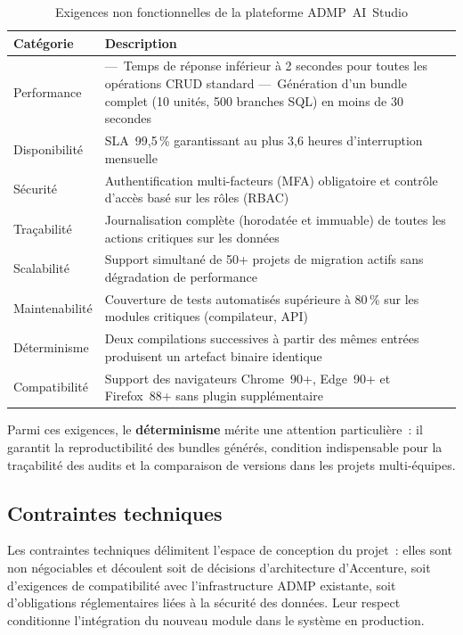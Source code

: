 \begin{table}[H]
\centering
\caption{Exigences non fonctionnelles de la plateforme ADMP~AI~Studio}
\label{tab:enf}
\begin{tabularx}{\textwidth}{p{3.2cm}X}
\toprule
\textbf{Catégorie} & \textbf{Description} \\
\midrule
Performance &
  ---~Temps de réponse inférieur à 2 secondes pour toutes les opérations CRUD standard\newline
  ---~Génération d'un bundle complet (10 unités, 500 branches SQL) en moins de 30 secondes \\
\addlinespace
Disponibilité &
  SLA~99,5\,\% garantissant au plus 3,6 heures d'interruption mensuelle \\
\addlinespace
Sécurité &
  Authentification multi-facteurs (MFA) obligatoire et contrôle d'accès basé sur les rôles (RBAC) \\
\addlinespace
Traçabilité &
  Journalisation complète (horodatée et immuable) de toutes les actions critiques sur les données \\
\addlinespace
Scalabilité &
  Support simultané de 50+ projets de migration actifs sans dégradation de performance \\
\addlinespace
Maintenabilité &
  Couverture de tests automatisés supérieure à 80\,\% sur les modules critiques (compilateur, API) \\
\addlinespace
Déterminisme &
  Deux compilations successives à partir des mêmes entrées produisent un artefact binaire identique \\
\addlinespace
Compatibilité &
  Support des navigateurs Chrome~90+, Edge~90+ et Firefox~88+ sans plugin supplémentaire \\
\bottomrule
\end{tabularx}
\end{table}

Parmi ces exigences, le \textbf{déterminisme} mérite une attention particulière~: il garantit la reproductibilité des bundles générés, condition indispensable pour la traçabilité des audits et la comparaison de versions dans les projets multi-équipes.

\subsection{Contraintes techniques}
\label{subsec:ct}

Les contraintes techniques délimitent l'espace de conception du projet~: elles sont non négociables et découlent soit de décisions d'architecture d'Accenture, soit d'exigences de compatibilité avec l'infrastructure ADMP existante, soit d'obligations réglementaires liées à la sécurité des données. Leur respect conditionne l'intégration du nouveau module dans le système en production.

